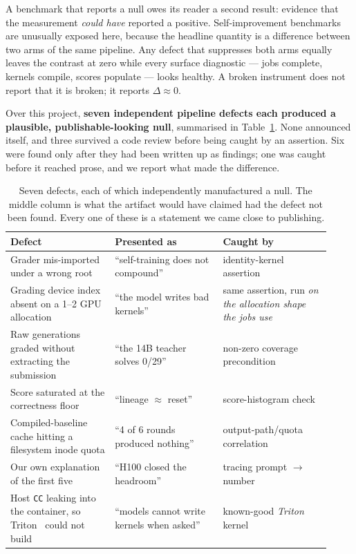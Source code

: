 A benchmark that reports a null owes its reader a second result: evidence that the
measurement \emph{could have} reported a positive. Self-improvement benchmarks are unusually
exposed here, because the headline quantity is a difference between two arms of the same
pipeline. Any defect that suppresses both arms equally leaves the contrast at zero while every
surface diagnostic --- jobs complete, kernels compile, scores populate --- looks healthy. A
broken instrument does not report that it is broken; it reports $\Delta \approx 0$.

Over this project, \textbf{seven independent pipeline defects each produced a plausible,
publishable-looking null}, summarised in Table~\ref{tab:defects}. None announced itself, and
three survived a code review before being caught by an assertion. Six were found only after
they had been written up as findings; one was caught before it reached prose, and we report
what made the difference.

\begin{table}[t]
\centering\small
\begin{tabular}{@{}p{0.30\linewidth}p{0.31\linewidth}p{0.31\linewidth}@{}}
\toprule
\textbf{Defect} & \textbf{Presented as} & \textbf{Caught by} \\
\midrule
Grader mis-imported under a wrong root & ``self-training does not compound'' & identity-kernel assertion \\
Grading device index absent on a 1--2 GPU allocation & ``the model writes bad kernels'' & same assertion, run \emph{on the allocation shape the jobs use} \\
Raw generations graded without extracting the submission & ``the 14B teacher solves 0/29'' & non-zero coverage precondition \\
Score saturated at the correctness floor & ``lineage $\approx$ reset'' & score-histogram check \\
Compiled-baseline cache hitting a filesystem inode quota & ``4 of 6 rounds produced nothing'' & output-path/quota correlation \\
Our own explanation of the first five & ``H100 closed the headroom'' & tracing prompt $\rightarrow$ number \\
Host \texttt{CC} leaking into the container, so Triton~\cite{tillet2019triton} could not build & ``models cannot write kernels when asked'' & known-good \emph{Triton} kernel \\
\bottomrule
\end{tabular}
\caption{Seven defects, each of which independently manufactured a null. The middle column is
what the artifact would have claimed had the defect not been found. Every one of these is a
statement we came close to publishing.}
\label{tab:defects}
\end{table}

